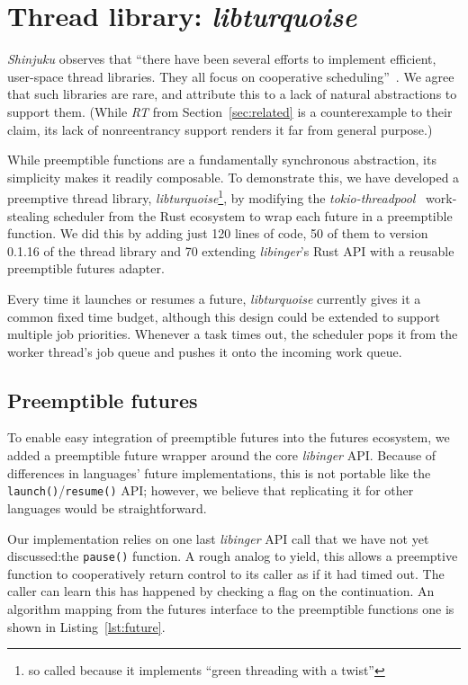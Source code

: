 \section{Thread library: \textit{libturquoise}}
\label{sec:libturquoise}

\textit{Shinjuku} observes that ``there have been several efforts to implement
efficient, user-space thread libraries.  They all focus on cooperative
scheduling''~\cite{Kaffes:nsdi2019}.  We agree that such libraries are rare, and
attribute this to a lack of natural abstractions to support them.  (While \textit{RT}
from Section~\ref{sec:related} is a counterexample to their claim, its lack of
nonreentrancy support renders it far from general purpose.)

While preemptible functions are a fundamentally synchronous abstraction, its
simplicity makes it readily composable.  To demonstrate this, we have developed a
preemptive thread library, \textit{libturquoise}\footnote{so called because it
implements ``green threading with a twist''}, by modifying the
\textit{tokio-threadpool}~\cite{www-tokio-threadpool} work-stealing scheduler from
the Rust ecosystem to wrap each future in a preemptible function.  We did this by
adding just 120 lines of code, 50 of them to version 0.1.16 of the thread library and
70 extending \textit{libinger}'s Rust API with a reusable preemptible futures
adapter.

Every time it launches or resumes a future, \textit{libturquoise} currently gives it
a common fixed time budget, although this design could be extended to support
multiple job priorities.  Whenever a task times out, the scheduler pops it from the
worker thread's job queue and pushes it onto the incoming work queue.


\subsection{Preemptible futures}

To enable easy integration of preemptible futures into the futures ecosystem, we
added a preemptible future wrapper around the core \textit{libinger} API.  Because
of differences in languages' future implementations, this is not portable like the
\texttt{launch()}/\texttt{resume()} API; however, we believe that replicating it for
other languages would be straightforward.

Our implementation relies on one last \textit{libinger} API call that we have not yet
discussed:\@ the \texttt{pause()} function.  A rough analog to yield, this allows a
preemptive function to cooperatively return control to its caller as if it had timed
out.  The caller can learn this has happened by checking a flag on the continuation.
An algorithm mapping from the futures interface to the preemptible functions one is
shown in Listing~\ref{lst:future}.

